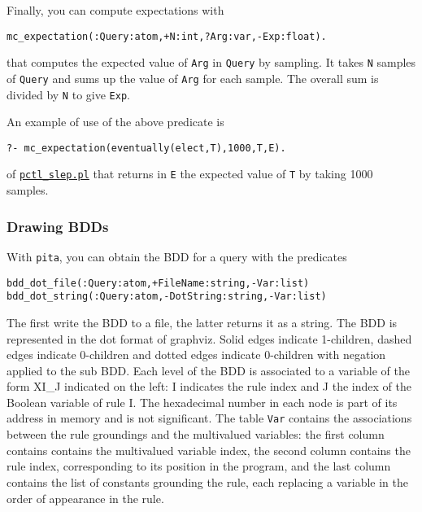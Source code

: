 
Finally, you can compute expectations with 
\begin{verbatim}
mc_expectation(:Query:atom,+N:int,?Arg:var,-Exp:float).
\end{verbatim}
that computes the expected value of \verb|Arg| in \verb|Query| by
sampling.
It takes \verb|N| samples of \verb|Query| and sums up the value of \verb|Arg| for
each sample. The overall sum is divided by \verb|N| to give \verb|Exp|.

An example of use of the above predicate is
\begin{verbatim}
?- mc_expectation(eventually(elect,T),1000,T,E).
\end{verbatim}
of \href{http://cplint.lamping.unife.it/example/inference/pctl_slep.pl}{\texttt{pctl\_slep.pl}}
that returns in \verb|E| the expected value of \verb|T| by taking 1000 samples.

\subsubsection{Drawing BDDs}

With \verb|pita|, you can obtain the BDD for a query with the predicates
\begin{verbatim}
bdd_dot_file(:Query:atom,+FileName:string,-Var:list)
bdd_dot_string(:Query:atom,-DotString:string,-Var:list)
\end{verbatim}
The first write the BDD to a file, the latter returns it as a string.
The BDD is represented in the dot format of graphviz.
Solid edges indicate 1-children, dashed edges indicate 0-children and dotted
edges indicate 0-children with negation applied to the sub BDD.
Each level of the BDD is associated to a variable of the form XI\_J indicated on the left:
I indicates the rule index and J the index of the Boolean variable of rule I.
The hexadecimal number in each node is part of its address in memory and is not significant.
The table \verb|Var| contains the associations between the rule groundings and the
multivalued variables: the first column contains contains the multivalued variable index,
the second column contains the rule index, corresponding
to its position in the program, and the last column contains the list 
of constants grounding the rule, each replacing a variable in the order of appearance in the
rule.

